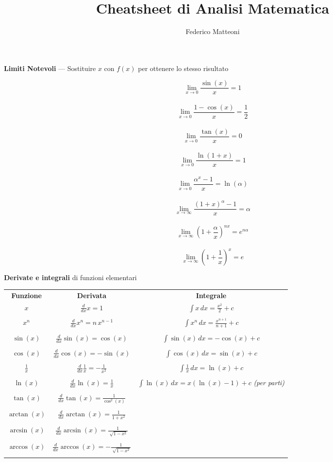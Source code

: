 \documentclass[10pt]{article}
\begin{document}
\title{Cheatsheet di Analisi Matematica}
\author{Federico Matteoni}
\date{ }
\renewcommand*\contentsname{Indice}

\maketitle
\textbf{Limiti Notevoli} --- Sostituire $x$ con $f(x)$ per ottenere lo stesso risultato
\begin{multicols}{4}
$$\lim_{x\to0} \frac{\sin(x)}{x} = 1$$\\
$$\lim_{x\to0} \frac{1 - \cos(x)}{x} = \frac{1}{2}$$\\
$$\lim_{x\to0} \frac{\tan(x)}{x} = 0$$\\
$$\lim_{x\to0} \frac{\ln(1 + x)}{x} = 1$$\\
$$\lim_{x\to0} \frac{\alpha^x - 1}{x} = \ln(\alpha)$$\\
$$\lim_{x\to\infty} \frac{(1 + x)^\alpha - 1}{x} = \alpha$$\\
$$\lim_{x\to\infty} (1 + \frac{\alpha}{x})^{nx} = e^{n\alpha}$$\\
$$\lim_{x\to\infty} (1 + \frac{1}{x})^{x} = e$$
\end{multicols}
\textbf{Derivate e integrali} di funzioni elementari
\begin{center}
	\begin{tabular}{c | c c}
		\textbf{Funzione} & \textbf{Derivata} & \textbf{Integrale} \\
		$x$ & $\frac{d}{dx} x = 1$ & $\int x\,dx = \frac{x^2}{2} + c$ \\
		\\
		$x^n$ & $\frac{d}{dx} x^n = n\,x^{n-1}$ & $\int x^n\,dx = \frac{x^{n+1}}{n+1} + c$ \\
		\\
		$\sin(x)$ & $\frac{d}{dx} \sin(x) = \cos(x)$ & $\int \sin(x)\,dx = -\cos(x) + c$ \\
		\\
		$\cos(x)$ & $\frac{d}{dx} \cos(x) = -\sin(x)$ & $\int \cos(x)\,dx = \sin(x) + c$ \\
		\\
		$\frac{1}{x}$ & $\frac{d}{dx} \frac{1}{x} = -\frac{1}{x^2}$ & $\int \frac{1}{x}\,dx = \ln(x) + c$ \\
		\\
		$\ln(x)$ & $\frac{d}{dx} \ln(x) = \frac{1}{x}$ & $\int \ln(x)\,dx = x(\ln(x) - 1) + c$ \textit{(per parti)} \\
		\\
		$\tan(x)$ & $\frac{d}{dx} \tan(x) = \frac{1}{\cos^2(x)}$ & \\
		\\
		$\arctan(x)$ & $\frac{d}{dx} \arctan(x) = \frac{1}{1 + x^2}$ & \\
		\\
		$\arcsin(x)$ & $\frac{d}{dx} \arcsin(x) = \frac{1}{\sqrt[]{1 - x^2}}$ & \\
		\\
		$\arccos(x)$ & $\frac{d}{dx} \arccos(x) = -\frac{1}{\sqrt[]{1 - x^2}}$ & \\
		\\
	\end{tabular}
\end{center}
\end{document}

